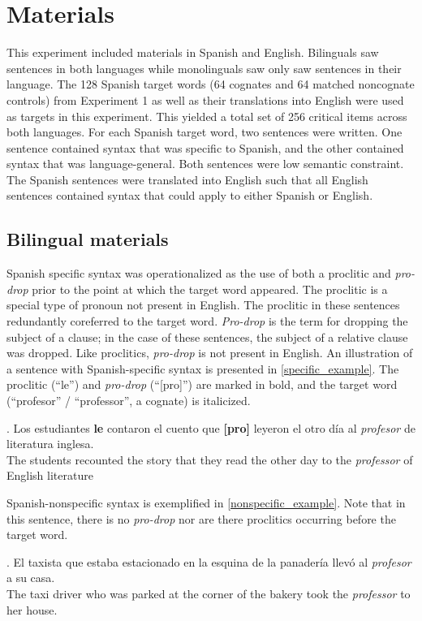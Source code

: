 \section{Materials}
This experiment included materials in Spanish and English. Bilinguals saw sentences in both languages while monolinguals saw only saw sentences in their language. The 128 Spanish target words (64 cognates and 64 matched noncognate controls) from Experiment 1 as well as their translations into English were used as targets in this experiment. This yielded a  total set of 256 critical items across both languages. For each Spanish target word, two sentences were written. One sentence contained syntax that was specific to Spanish, and the other contained syntax that was language-general. Both sentences were low semantic constraint. The Spanish sentences were translated into English such that all English sentences contained syntax that could apply to either Spanish or English. 

\subsection{Bilingual materials}
Spanish specific syntax was operationalized as the use of both a proclitic and \textit{pro-drop} prior to the point at which the target word appeared. The proclitic is a special type of pronoun not present in English. The proclitic in these sentences redundantly coreferred to the target word. \textit{Pro-drop} is the term for dropping the subject of a clause; in the case of these sentences, the subject of a relative clause was dropped. Like proclitics, \textit{pro-drop} is not present in English. An illustration of a sentence with Spanish-specific syntax is presented in  \ref{specific_example}. The proclitic (``le'') and \textit{pro-drop} (``[pro]'') are marked in bold, and the target word (``profesor'' / ``professor'', a cognate) is italicized. 

\ex.\label{specific_example} Los estudiantes \textbf{le} contaron el cuento que \textbf{[pro]} leyeron el otro d\'{i}a al \textit{profesor} de literatura inglesa.\\
  The students recounted the story that they read the other day to the \textit{professor} of English literature

 Spanish-nonspecific syntax is exemplified in \ref{nonspecific_example}. Note that in this sentence, there is no \textit{pro-drop} nor are there proclitics occurring before the target word.

\ex.\label{nonspecific_example} El taxista que estaba estacionado en la esquina de la panadería llev\'{o} al \textit{profesor} a su casa.\\
  The taxi driver who was parked at the corner of the bakery took the \textit{professor} to her house.


